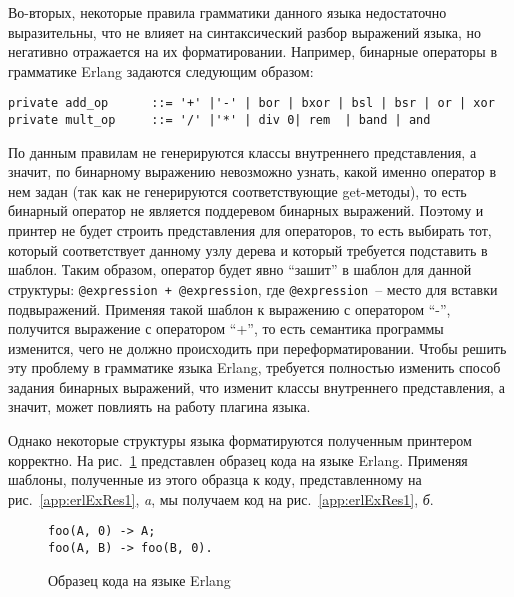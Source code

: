 Во-вторых, некоторые правила грамматики данного языка недостаточно выразительны, что не влияет на синтаксический разбор выражений языка, но негативно отражается на их форматировании.
Например, бинарные операторы в грамматике Erlang задаются следующим образом:
\begin{lstlisting}[basicstyle=\normalsize\ttfamily, columns=fullflexible]
private add_op      ::= '+' |'-' | bor | bxor | bsl | bsr | or | xor
private mult_op     ::= '/' |'*' | div 0| rem  | band | and
\end{lstlisting}
\noindent
По данным правилам не генерируются классы внутреннего представления, а значит, по бинарному выражению невозможно узнать, какой именно оператор в нем задан (так как не генерируются соответствующие get-методы), то есть бинарный оператор не является поддеревом бинарных выражений.
Поэтому и принтер не будет строить представления для операторов, то есть выбирать тот, который соответствует данному узлу дерева и который требуется подставить в шаблон.
Таким образом, оператор будет явно ``зашит'' в шаблон для данной структуры: \lstinline[basicstyle=\normalsize\ttfamily, columns=fullflexible]{@expression + @expression}, где \lstinline[basicstyle=\normalsize\ttfamily, columns=fullflexible]{@expression}~-- место для вставки подвыражений.
Применяя такой шаблон к выражению с оператором ``-'', получится выражение с оператором ``+'', то есть семантика программы изменится, чего не должно происходить при переформатировании.
Чтобы решить эту проблему в грамматике языка Erlang, требуется полностью изменить способ задания бинарных выражений, что изменит классы внутреннего представления, а значит, может повлиять на работу плагина языка.

Однако некоторые структуры языка форматируются полученным принтером корректно. 
На рис.~\ref{app:erlT1} представлен образец кода на языке Erlang. Применяя шаблоны, полученные из этого образца к коду, представленному на рис.~\ref{app:erlExRes1}, \emph{a}, мы получаем код на рис.~\ref{app:erlExRes1}, \emph{б}.
\begin{figure}[h]
  \centering
  \begin{lstlisting}
foo(A, 0) -> A;
foo(A, B) -> foo(B, 0).
  \end{lstlisting}
  \caption{Образец кода на языке Erlang}
  \label{app:erlT1}
\end{figure}

